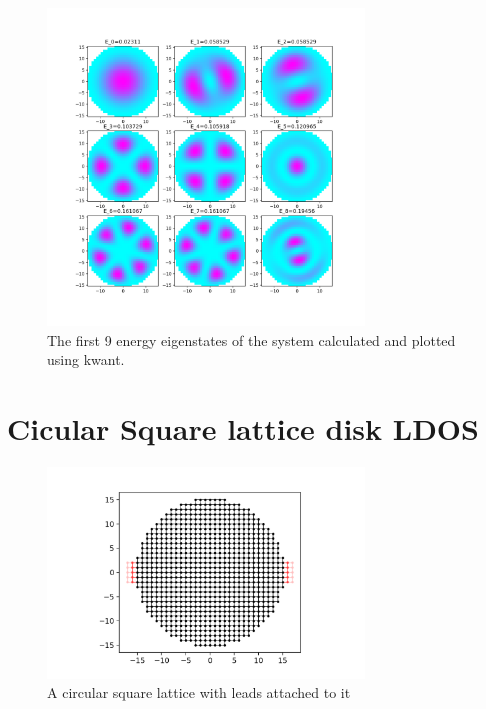 \documentclass[12pt]{article}
\numberwithin{equation}{section}
\begin{document}
\newpage
\begin{figure}[h!]
  \begin{center}
  \includegraphics[width=0.75\textwidth]{./media/circular_square_lat_eigvs.png}
  \caption{The first 9 energy eigenstates of the system calculated and plotted using kwant.}
  \label{fig:ciclat_eigvs}
  \end{center}
\end{figure}

\newpage
\section{Cicular Square lattice disk LDOS}
\begin{figure}[h!]
  \begin{center}
  \includegraphics[width=0.75\textwidth]{./media/circular_sq_lat_wleads.png}
  \caption{A circular square lattice with leads attached to it}
  \label{fig:ciclat_wleads}
  \end{center}
\end{figure}
\end{document}
